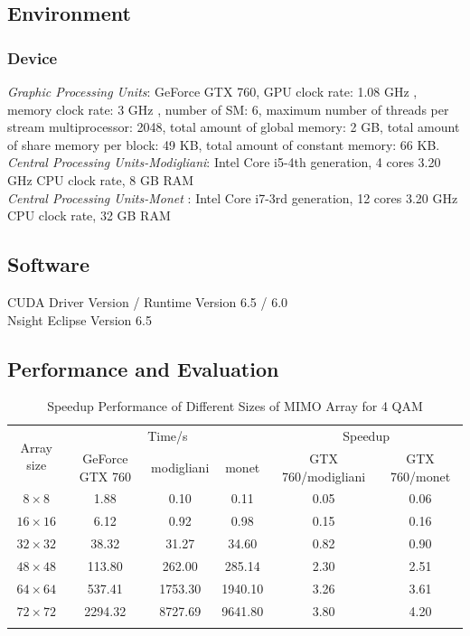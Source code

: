 \documentclass[12pt,a4paper,final]{article}
\begin{document}
\begin{spacing}{2.5}
\subsection{Environment}
\subsubsection{Device}
\emph{Graphic Processing Units}: GeForce GTX 760, GPU clock rate: 1.08 GHz , memory clock rate: 3 GHz , number of SM: 6, maximum number of threads per stream multiprocessor: 2048, total amount of global memory: 2 GB, total amount of share memory per block: 49 KB, total amount of constant memory: 66 KB. \\
\emph{Central Processing Units-Modigliani}: Intel Core i5-4th generation, 4 cores 3.20 GHz CPU clock rate, 8 GB RAM\\
\emph{Central Processing Units-Monet} : Intel Core i7-3rd generation, 12 cores 3.20 GHz CPU clock rate, 32 GB RAM\\
\subsection{Software}
CUDA Driver Version / Runtime Version      6.5 / 6.0\\
Nsight Eclipse Version 6.5
\subsection{Performance and Evaluation}
\begin{table}[htb]
\caption{Speedup Performance of Different Sizes of MIMO Array for 4 QAM}
\centering
\begin{tabular}{|c|c|c|c|c|c|}
\hline
\multirow{2}{*}{ Array size} & \multicolumn{3}{|c|}{Time/s} & \multicolumn{2}{|c|}{Speedup}\\
\cline{2-6}
&GeForce GTX 760 & modigliani & monet &  GTX 760/modigliani  &  GTX 760/monet \\
\hline
$8\times 8$& 1.88& 0.10&0.11 & 0.05& 0.06\\
\hline
$16\times 16$&6.12 & 0.92&0.98& 0.15& 0.16\\
\hline
$32\times 32$&38.32 & 31.27& 34.60& 0.82& 0.90\\
\hline
$48\times 48$&113.80& 262.00& 285.14& 2.30& 2.51\\
\hline
$64\times 64$& 537.41&1753.30&1940.10&3.26& 3.61 \\
\hline
$72\times 72 $&2294.32&8727.69 &9641.80 &3.80 &4.20 \\
\hline
\label{speedup1}


\end{tabular}
\end{table}
\end{spacing}
\end{document}
